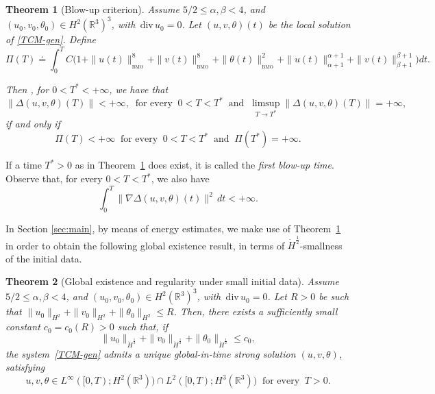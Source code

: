 \documentclass[a4paper]{article}
\newtheorem{thm}{Theorem}[section]
\newcommand{\R}{\mathbb{R}}
\providecommand{\dv}{\,\mathrm{div}\,}
\begin{document}
    \begin{thm}[Blow-up criterion] \label{th:bu criterion}  Assume 
      $5/2\leq \alpha, \beta < 4$, and
      $(u_0, v_0, \theta_0) \in H^2(\R^3)^3$, with $\dv u_0 = 0$. Let $(u,v,\theta)(t)$ be the local solution of \eqref{TCM-gen}. Define
  \begin{equation}
  \label{e:Pi}
  \Pi(T) \doteq 
  \int_0^T C \big(1
      +\|u(t)\|_{{}_{\textrm{BMO}}}^{8} + \|v(t)\|_{{}_{\textrm{BMO}}}^{8} +
      \|\theta(t)\|_{{}_{\textrm{BMO}}}^2 +
      \|u(t)\|^{\alpha+1}_{\alpha+1}+\|v(t)\|^{\beta+1}_{\beta+1}
      \big)dt.
  \end{equation}
      
      Then , for $0< T^\ast < +\infty$, we have that  
  \begin{equation*}
  \|\Delta (u, v, \theta) (T)\| < +\infty, \ \mbox{ for every } \ 0<T< T^\ast \ \mbox{ and } \ \limsup_{T \to {T^\ast}} \|\Delta (u, v, \theta) (T)\|=+\infty,
  \end{equation*}
  if and only if 
  \begin{equation*}
  \Pi(T) < +\infty \ \mbox{ for every } \ 0<T<T^\ast \ \mbox{ and } \ \Pi(T^\ast) =+\infty.
  \end{equation*}
  \end{thm}
  
    If a time $T^\ast>0$ as in Theorem~\ref{th:bu criterion}
  does exist, it is called the \emph{first blow-up time}. Observe
  that, for every $0<T<T^\ast$, we also have
  \begin{equation*}
    \int_{0}^{T}\|\nabla \Delta (u,v,\theta)(t)\|^2\,dt < +\infty.
  \end{equation*}
  
  In Section \ref{sec:main}, by means of energy estimates, we make use
  of Theorem~\ref{th:bu criterion} in order to obtain the following
  global existence result,
  in terms of $\dot H^{\frac12}$-smallness of the initial data.
%
  \begin{thm}[Global existence and regularity under small initial data] \label{main} Assume
      $5/2\leq \alpha, \beta < 4$, and
      $(u_0, v_0, \theta_0) \in H^2(\R^3)^3$, with $\dv u_0 = 0$.  Let
      $R>0$ be such that $\|u_0\|_{ H^2}+\|v_0\|_{H^2}+ \|\theta_0\|_{ H^2} \le R$.
      Then, there exists a sufficiently small constant $c_0 =c_0(R) > 0$ such that, if
    \begin{equation} \label{constant-c0}
      \|u_0\|_{\dot H^{\frac{1}{2}}} + \|v_0\|_{\dot H^{\frac{1}{2}}} +
      \|\theta_0\|_{\dot H^{\frac{1}{2}}}\leq c_0 ,
    \end{equation}
    the system~\eqref{TCM-gen} admits a unique global-in-time strong
    solution $(u, v, \theta)$, satisfying
%
    \begin{equation*}
      u,v,\theta \in L^\infty([0, T); H^2(\R^3))\cap
      L^2([0, T); H^3(\R^3)) \ \mbox{ for every } \ T>0.
    \end{equation*}
  \end{thm}
  
\end{document}
